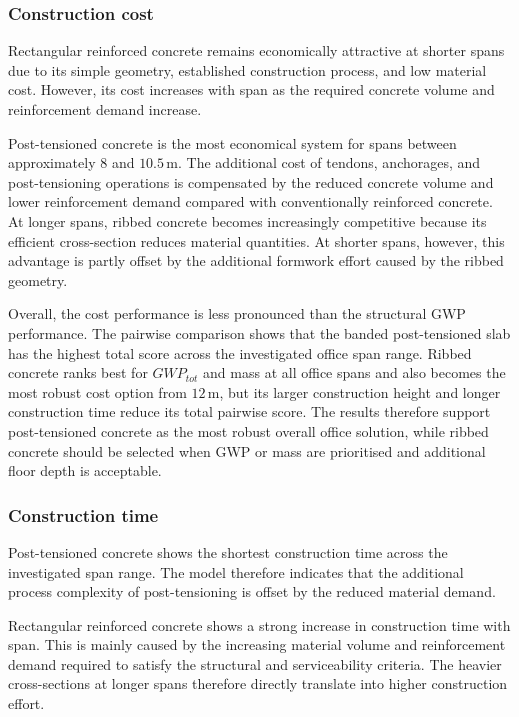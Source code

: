 \subsubsection{Construction cost}

Rectangular reinforced concrete remains economically attractive at shorter spans due to its simple geometry, established construction process, and low material cost. However, its cost increases with span as the required concrete volume and reinforcement demand increase.

Post-tensioned concrete is the most economical system for spans between approximately \(8\) and \(10.5\,\mathrm{m}\). The additional cost of tendons, anchorages, and post-tensioning operations is compensated by the reduced concrete volume and lower reinforcement demand compared with conventionally reinforced concrete. At longer spans, ribbed concrete becomes increasingly competitive because its efficient cross-section reduces material quantities. At shorter spans, however, this advantage is partly offset by the additional formwork effort caused by the ribbed geometry.

Overall, the cost performance is less pronounced than the structural GWP performance. The pairwise comparison shows that the banded post-tensioned slab has the highest total score across the investigated office span range. Ribbed concrete ranks best for \(GWP_{tot}\) and mass at all office spans and also becomes the most robust cost option from \(12\,\mathrm{m}\), but its larger construction height and longer construction time reduce its total pairwise score. The results therefore support post-tensioned concrete as the most robust overall office solution, while ribbed concrete should be selected when GWP or mass are prioritised and additional floor depth is acceptable.

\subsubsection{Construction time}

Post-tensioned concrete shows the shortest construction time across the investigated span range. The model therefore indicates that the additional process complexity of post-tensioning is offset by the reduced material demand.

Rectangular reinforced concrete shows a strong increase in construction time with span. This is mainly caused by the increasing material volume and reinforcement demand required to satisfy the structural and serviceability criteria. The heavier cross-sections at longer spans therefore directly translate into higher construction effort.

